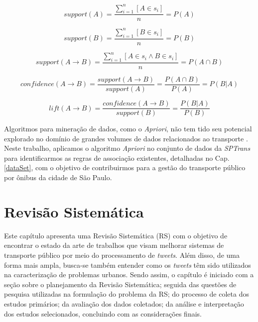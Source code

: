 \documentclass[
	12pt,				%
	oneside,			%
	a4paper,			%
	english,			%
	brazil				%
	]{abntex2ppgsi}
\begin{document}
{{\begin{equation}
\label{eqSupportA}
support(A) = \dfrac{\sum_{i=1}^{n}[A \in s_i]} {n} = P(A) 
\end{equation}

\begin{equation}
\label{eqSupportB}
support(B) = \dfrac{\sum_{i=1}^{n}[B \in s_i]} {n} = P(B) 
\end{equation}

\begin{equation}
\label{eqSupports}
support(A \rightarrow B) = \dfrac{\sum_{i=1}^{n}[A \in s_i \land B \in s_i]} {n} = P(A \cap B)
\end{equation}

\begin{equation}
\label{eqConfidence}
confidence(A \rightarrow B) = \dfrac{support(A \rightarrow B)}{support(A)} = \dfrac{P(A \cap B)}{P(A)} = P(B|A)
\end{equation}

\begin{equation}
\label{eqLift}
lift(A \rightarrow B) = \dfrac{confidence(A \rightarrow B)}{support(B)} = \dfrac{P(B|A)}{P(B)}
\end{equation}

Algoritmos para mineração de dados, como o \textit{Apriori}, não tem tido seu potencial explorado no domínio de grandes volumes de dados relacionados ao transporte \cite{park2018apriori}. Neste trabalho, aplicamos o algoritmo \textit{Apriori} no conjunto de dados da \textit{SPTrans} para identificarmos as regras de associação existentes, detalhadas no Cap. \ref{dataSet}, com o objetivo de contribuirmos para a gestão do transporte público por ônibus da cidade de São Paulo.   

\chapter{Revisão Sistemática}
\label{revisao}
Este capítulo apresenta uma Revisão Sistemática (RS) com o objetivo de encontrar o estado da arte de trabalhos que visam melhorar sistemas de transporte público por meio do processamento de \textit{tweets}. Além disso, de uma forma mais ampla, busca-se também entender como os \textit{tweets} têm sido utilizados na caracterização de problemas urbanos. Sendo assim, o capítulo é iniciado com a seção sobre o planejamento da Revisão Sistemática; seguida das questões de pesquisa utilizadas na formulação do problema da RS; do processo de coleta dos estudos primários; da avaliação dos dados coletados; da análise e interpretação dos estudos selecionados, concluindo com as considerações finais.

}}
\end{document}
